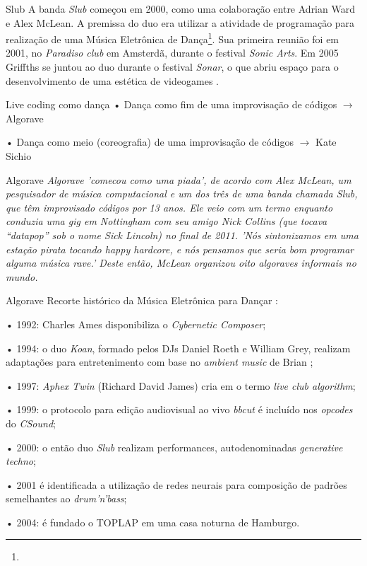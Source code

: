 \documentclass[aspectratio=169]{beamer}
\begin{document}
\begin{frame}{Slub}
A banda \emph{Slub} começou em 2000, como uma colaboração entre Adrian Ward e Alex McLean. A premissa do duo era utilizar a atividade de programação para realização de uma Música Eletrônica de Dança\footnote{}. Sua primeira reunião foi em 2001, no \emph{Paradiso club} em Amsterdã, durante o festival \emph{Sonic Arts}. Em 2005 Griffths se juntou ao duo durante o festival \emph{Sonar}, o que abriu espaço para o desenvolvimento de uma estética de videogames \cite[p.~138--140]{McLean2011}.
\end{frame}

\begin{frame}{Live coding como dança}
• Dança como fim de uma improvisação de códigos $\rightarrow$ Algorave 

• Dança como meio (coreografia) de uma improvisação de códigos $\rightarrow$ Kate Sichio 
\end{frame}

\begin{frame}{Algorave}
\emph{\emph{Algorave} 'comecou como uma piada', de acordo com Alex McLean, um pesquisador de música computacional e um dos três de uma banda chamada \emph{Slub}, que têm improvisado códigos por 13 anos. Ele veio com um termo enquanto conduzia uma \emph{gig} em Nottingham com seu amigo Nick Collins (que tocava ``datapop'' sob o nome Sick Lincoln) no final de 2011. 'Nós sintonizamos em uma estação pirata tocando \emph{happy hardcore}, e nós pensamos que seria bom programar alguma música \emph{rave}.' Deste então, McLean organizou oito \emph{algoraves} informais no mundo.} \cite{chesire_algorave_2013}
\end{frame}

\begin{frame}{Algorave}
Recorte histórico da Música Eletrônica para Dançar \cite{collins_algorave_2014}:

• 1992: Charles Ames disponibiliza o \emph{Cybernetic Composer};

• 1994: o duo \emph{Koan}, formado pelos DJs Daniel Roeth e William Grey, realizam adaptações para entretenimento com base no \emph{ambient music} de Brian ;

• 1997: \emph{Aphex Twin} (Richard David James) cria em  o termo \emph{live club algorithm};

• 1999: o protocolo para edição audiovisual ao vivo \emph{bbcut} \cite{collins_bbcut_2003} é incluído nos \emph{opcodes} do \emph{CSound};

• 2000: o então duo \emph{Slub} realizam performances, autodenominadas \emph{generative techno};

• 2001 é identificada a utilização de redes neurais para composição de padrões semelhantes ao \emph{drum'n'bass};

• 2004: é fundado o TOPLAP em uma casa noturna de Hamburgo.
\end{frame}
\end{document}
